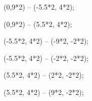  (0,9*2) -- (-5.5*2, 4*2);%

 (0,9*2) -- (5.5*2, 4*2);%


 (-5.5*2, 4*2) -- (-9*2, -2*2);%

 (-5.5*2, 4*2) -- (-2*2, -2*2);%

 
 (5.5*2, 4*2) -- (2*2, -2*2);%

 (5.5*2, 4*2) -- (9*2, -2*2);%